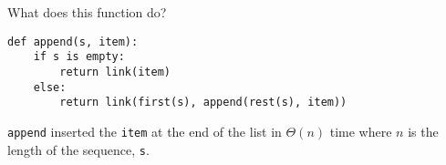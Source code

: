 \begin{blocksection}
\question What does this function do?

\begin{lstlisting}
def append(s, item):
    if s is empty:
        return link(item)
    else:
        return link(first(s), append(rest(s), item))
\end{lstlisting}

\begin{solution}[1em]
\lstinline$append$ inserted the \lstinline$item$ at the end of the list in $\Theta(n)$ time where $n$ is the length of the sequence, \lstinline$s$.
\end{solution}
\end{blocksection}
